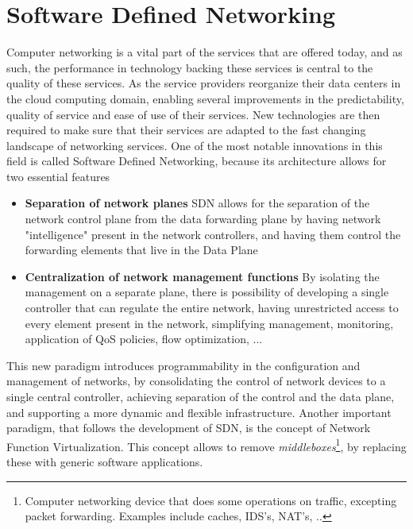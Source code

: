 \chapter{Software Defined Networking} \label{chap:sdn} %

Computer networking is a vital part of the services that are offered today, and as such, the performance in technology backing these services is central to the quality of these services. As the service providers reorganize their
data centers in the cloud computing domain, enabling several improvements in the predictability, quality of service and ease of use of their services. New technologies are then required to make sure that their services are adapted
to the fast changing landscape of networking services. One of the most notable innovations in this field is called Software Defined Networking, because its architecture allows for two essential features

\begin {itemize}
    \item \textbf{Separation of network planes} SDN allows for the separation of the network control plane from the data forwarding plane by having network "intelligence" present in the network controllers, and having them
control the forwarding elements that live in the Data Plane
    \item \textbf{Centralization of network management functions} By isolating the management on a separate plane, there is possibility of developing a single controller that can regulate the entire network, having unrestricted access to every element present in the network, simplifying management, monitoring, application of QoS policies, flow optimization, ...
\end {itemize}

\par This new paradigm introduces programmability in the configuration and management of networks, by consolidating the control of network devices to a single central controller, achieving separation of the control and the 
data plane, and supporting a more dynamic and flexible infrastructure. Another important paradigm, that follows the development of SDN, is the concept of Network Function Virtualization. This concept allows to remove 
\textit {middleboxes}\footnote {Computer networking device that does some operations on traffic, excepting packet forwarding. Examples include caches, IDS's, NAT's, ..}, by replacing these with generic software 
applications.


